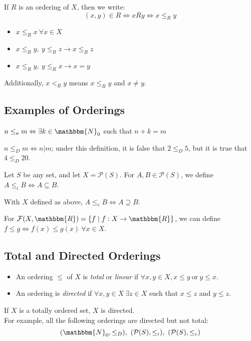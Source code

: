 \documentclass[10pt]{extarticle}
\newcommand{\N}{\mathbbm{N}}
\newcommand{\R}{\mathbbm{R}}
\begin{document}
    If $R$ is an ordering of $X$, then we write:
    \[
      (x,y)\in R \Leftrightarrow xRy \Leftrightarrow x\leq_{R} y
    \] 
    \begin{itemize}
      \item $x\leq_{R}x~\forall x\in X$
      \item $x\leq_R y,~y\leq_R z \rightarrow x\leq_R z$
      \item $x\leq_R y,~y\leq_R x \rightarrow x=y$
    \end{itemize}
    Additionally, $x<_R y$ means $x\leq_R y$ and $x\neq y$.
    \subsection{Examples of Orderings}%
    \begin{description}[font=\normalfont]
      \item[Algebraic Ordering of $\N_0$:] $n\leq_a m\Leftrightarrow \exists k\in \N_0$ such that $n+k = m$
      \item[$\N$ ordered via division:] $n\leq_D m \Leftrightarrow n|m$; under this definition, it is false that $2\leq_D 5$, but it is true that $4\leq_D 20$.
      \item[Inclusion:] Let $S$ be any set, and let $X = \mathcal{P}(S)$. For $A,B\in \mathcal{P}(S)$, we define $A\leq_i B \Leftrightarrow A\subseteq B$.
      \item[Containment:] With $X$ defined as above, $A\leq_c B\Leftrightarrow A\supseteq B$.
      \item[Functions:] For $\mathcal{F}(X,\R) = \{f\mid f:X\rightarrow\R\}$, we can define $f\leq g\Leftrightarrow f(x)\leq g(x)~\forall x\in X$.
    \end{description}
    \subsection{Total and Directed Orderings}%
      \begin{itemize}
        \item An ordering $\leq$ of $X$ is \textsl{total} or \textit{linear} if $\forall x,y\in X, x\leq y~\text{or}~y\leq x$. 
        \item An ordering is \textsl{directed} if $\forall x,y\in X~\exists z\in X$ such that $x\leq z$ and $y\leq z$.
      \end{itemize}
      If $X$ is a totally ordered set, $X$ is directed.\\

      For example, all the following orderings are directed but not total:
      \[
        (\N_0,\leq_D),~(\mathcal{P}(S),\leq_i),~(\mathcal{P}(S),\leq_c)
      \] 
\end{document}
